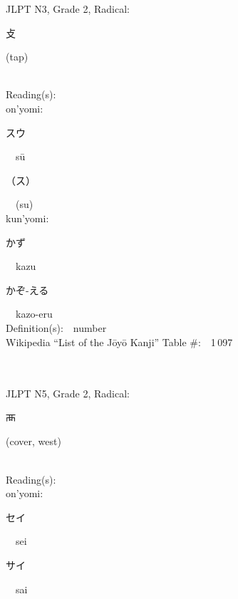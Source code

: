 \begin{multicols}{2}
{JLPT N3, Grade 2, Radical:\ \ {\begin{CJK}{UTF8}{min} 攴 \end{CJK}} (tap) } \\
Reading(s):\ \ \\
{\hspace*{1em}}on'yomi:\ \ \\
{\hspace*{2em}}{\begin{CJK}{UTF8}{min} スウ \end{CJK}}\ \ s\=u\ \ \\
{\hspace*{2em}}{\begin{CJK}{UTF8}{min} （ス） \end{CJK}}\ \ (su)\ \ \\
{\hspace*{1em}}kun'yomi:\ \ \\
{\hspace*{2em}}{\begin{CJK}{UTF8}{min} かず \end{CJK}}\ \ kazu\ \ \\
{\hspace*{2em}}{\begin{CJK}{UTF8}{min} かぞ-える \end{CJK}}\ \ kazo-eru\ \ \\
Definition(s):\ \ number \\
Wikipedia ``List of the J\=oy\=o Kanji'' Table \#:\ \ 1\,097 \\
\ \ \\
{\fontsize{34pt}{40pt}  }\ \ \\  %
{JLPT N5, Grade 2, Radical:\ \ {\begin{CJK}{UTF8}{min} 襾 \end{CJK}} (cover, west) } \\
Reading(s):\ \ \\
{\hspace*{1em}}on'yomi:\ \ \\
{\hspace*{2em}}{\begin{CJK}{UTF8}{min} セイ \end{CJK}}\ \ sei\ \ \\
{\hspace*{2em}}{\begin{CJK}{UTF8}{min} サイ \end{CJK}}\ \ sai\ \ \\

\end{multicols}
